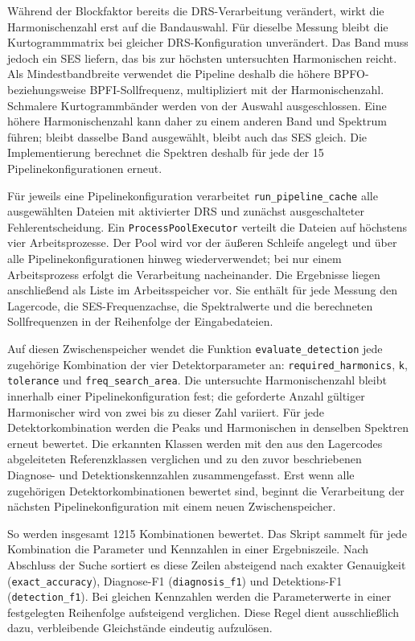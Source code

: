 Während der Blockfaktor bereits die DRS-Verarbeitung verändert, wirkt die
Harmonischenzahl erst auf die Bandauswahl. Für dieselbe Messung bleibt die
Kurtogrammmatrix bei gleicher DRS-Konfiguration unverändert. Das Band muss jedoch
ein \acrshort{SES} liefern, das bis zur höchsten untersuchten Harmonischen
reicht. Als Mindestbandbreite verwendet die Pipeline deshalb die höhere
BPFO- beziehungsweise BPFI-Sollfrequenz, multipliziert mit der Harmonischenzahl.
Schmalere Kurtogrammbänder werden von der Auswahl ausgeschlossen. Eine höhere
Harmonischenzahl kann daher zu einem anderen Band und Spektrum führen;
bleibt dasselbe Band ausgewählt, bleibt auch das \acrshort{SES} gleich.
Die Implementierung berechnet die Spektren deshalb für jede der
15 Pipelinekonfigurationen erneut.

Für jeweils eine Pipelinekonfiguration verarbeitet
\texttt{run\_\allowbreak pipeline\_\allowbreak cache} alle ausgewählten Dateien
mit aktivierter DRS und zunächst ausgeschalteter Fehlerentscheidung.
Ein \texttt{ProcessPool\allowbreak Executor} verteilt die Dateien auf höchstens
vier Arbeitsprozesse. Der Pool wird vor der äußeren Schleife angelegt und
über alle Pipelinekonfigurationen hinweg wiederverwendet; bei nur einem
Arbeitsprozess erfolgt die Verarbeitung nacheinander.
Die Ergebnisse liegen anschließend als Liste im Arbeitsspeicher vor.
Sie enthält für jede Messung den Lagercode, die SES-Frequenzachse, die
Spektralwerte und die berechneten Sollfrequenzen in der Reihenfolge der
Eingabedateien.

Auf diesen Zwischenspeicher wendet die Funktion
\texttt{evaluate\_\allowbreak detection} jede zugehörige Kombination der vier
Detektorparameter an: \texttt{required\_\allowbreak harmonics},
\texttt{k}, \texttt{tolerance} und
\texttt{freq\_\allowbreak search\_\allowbreak area}.
Die untersuchte Harmonischenzahl bleibt innerhalb einer Pipelinekonfiguration
fest; die geforderte Anzahl gültiger Harmonischer wird von zwei bis zu dieser
Zahl variiert. Für jede Detektorkombination werden die Peaks und Harmonischen in
denselben Spektren erneut bewertet. Die erkannten Klassen werden mit den aus
den Lagercodes abgeleiteten Referenzklassen verglichen und zu den zuvor
beschriebenen Diagnose- und Detektionskennzahlen zusammengefasst.
Erst wenn alle zugehörigen Detektorkombinationen bewertet sind, beginnt
die Verarbeitung der nächsten Pipelinekonfiguration mit einem neuen
Zwischenspeicher.

So werden insgesamt 1215 Kombinationen bewertet.
Das Skript sammelt für jede Kombination die Parameter und Kennzahlen in einer
Ergebniszeile. Nach Abschluss der Suche sortiert es diese Zeilen absteigend
nach exakter Genauigkeit (\texttt{exact\_\allowbreak accuracy}),
Diagnose-F1 (\texttt{diagnosis\_\allowbreak f1}) und Detektions-F1
(\texttt{detection\_\allowbreak f1}).
Bei gleichen Kennzahlen werden die Parameterwerte in einer festgelegten
Reihenfolge aufsteigend verglichen. Diese Regel dient ausschließlich dazu,
verbleibende Gleichstände eindeutig aufzulösen.

